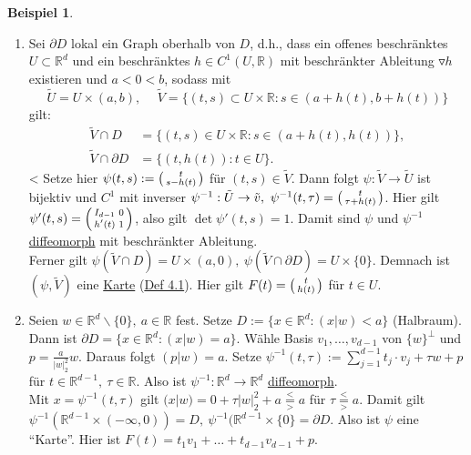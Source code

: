 \documentclass[a4paper]{scrreprt}
\newcommand{\R}{\mathbb{R}}
\newcommand{\overunderset}[3]{\overset{#1}{\underset{#3}{#2}}}
\newenvironment{jsmallmatrix}{\left( \begin{smallmatrix}}{\end{smallmatrix} \right)}
\newcommand{\jhyperref}[2]{\hyperref[j_#1]{#2}}
\newcommand{\jlink}[1]{\jhyperref{#1}{#1}}
\newcommand{\jabb}[3]{ #1: #2 \rightarrow #3 }
\theoremstyle{plain}
\theoremstyle{definition}
\newtheorem{expl}[thm]{Beispiel}
\begin{document}
{{{{\begin{expl}
\begin{enumerate}
        
        \item Sei $\partial D$ lokal ein Graph oberhalb von $D$, d.h., dass ein offenes beschränktes $U\subset \R^d$ und ein beschränktes $h\in C^1(U,\R)$ mit beschränkter Ableitung $\triangledown h$ existieren und $a < 0 < b$, sodass mit
        \[
            \tilde{U} = U \times (a,b), \hspace{15pt} \tilde{V} = \{(t,s) \subset U \times \R : s \in (a+h(t), b+h(t))\}
        \]
        gilt:
        \[
            \begin{split}
                \tilde{V} \cap D &= \{(t,s) \in U \times \R : s\in (a+h(t), h(t))\},\\
                \tilde{V} \cap \partial D &= \{(t,h(t)) : t \in U\}.
            \end{split}
        \]<
        Setze hier $\psi(t,s) := \begin{jsmallmatrix} t \\ s - h(t) \end{jsmallmatrix}$ für $(t,s) \in \tilde{V}$. Dann folgt $\jabb{\psi}{\tilde{V}}{\tilde{U}}$ ist bijektiv und $C^1$ mit inverser $\jabb{\psi^{-1}}{\tilde{U}}{\tilde{v}},\ \psi^{-1}(t,\tau) = \begin{jsmallmatrix} t \\ \tau + h(t) \end{jsmallmatrix}$. Hier gilt $\psi'(t,s) = \begin{jsmallmatrix}I_{d-1} & 0 \\ h'(t) & 1\end{jsmallmatrix}$, also gilt $\det \psi'(t,s)=1$. Damit sind $\psi$ und $\psi^{-1}$ \jlink{diffeomorph} mit beschränkter Ableitung.\\
        Ferner gilt $\psi(\tilde{V}\cap D) = U \times (a,0),\ \psi(\tilde{V} \cap \partial D) = U \times \{0\}$. Demnach ist $(\psi, \tilde{V})$ eine \jlink{Karte} (\jlink{Def 4.1}). Hier gilt $F(t) = \begin{jsmallmatrix}t \\ h(t)\end{jsmallmatrix}$ für $t\in U$.
        
        \item Seien $w \in \R^d\backslash \{0\},\ a\in \R$ fest. Setze $D := \{x \in \R^d: (x|w) < a\}$ (Halbraum). Dann ist $\partial D = \{x \in \R^d : (x|w) = a\}$. Wähle Basis $v_1,\dots, v_{d-1}$ von $\{w\}^\bot$ und $p = \frac{a}{|w|_2^2}w$. Daraus folgt $(p|w) = a$. Setze $\psi^{-1}(t,\tau) := \sum_{j=1}^{d-1} t_j\cdot v_j + \tau w + p$ für $t \in \R^{d-1},\ \tau \in \R$. Also ist $\jabb{\psi^{-1}}{\R^d}{\R^d}$ \jlink{diffeomorph}.\\
        Mit $x = \psi^{-1}(t,\tau)$ gilt $(x|w) = 0 + \tau |w|_2^2 + a \overunderset{<}{=}{>} a$ für $\tau \overunderset{<}{=}{>} a$. Damit gilt $\psi^{-1}(\R^{d-1} \times (-\infty,0)) = D, \ \psi^{-1}(\R^{d-1} \times \{0\}= \partial D$. Also ist $\psi$ eine ``Karte''. Hier ist $F(t) = t_1 v_1 + \dots + t_{d-1} v_{d-1} + p$.
    \end{enumerate}
\end{expl}

}}}}
\end{document}

